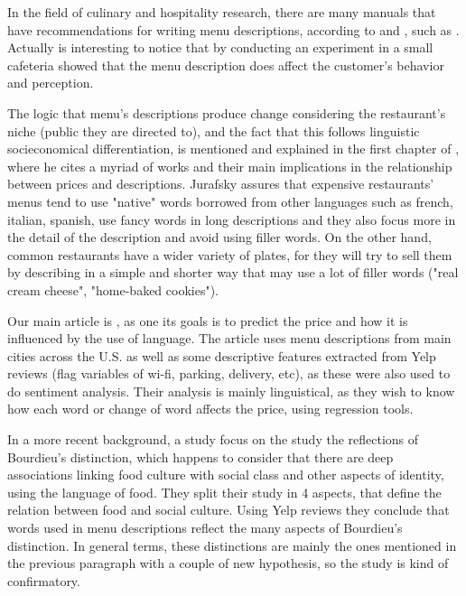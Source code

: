\documentclass[11pt,letterpaper]{article}
\begin{document}
In the field of culinary and hospitality research, there are many manuals that have recommendations for writing menu descriptions, according to \cite{chahuneau2012word} and \cite{jurafsky2014language}, such as \cite{kasavana1990menu} . Actually is interesting to notice that by conducting an experiment in a small cafeteria \cite{wansink2005descriptive} showed that the menu description does affect the customer's behavior and perception.

The logic that menu's descriptions produce change considering the restaurant's niche (public they are directed to), and the fact that this follows linguistic socieconomical differentiation, is mentioned and explained in the first chapter of \cite{jurafsky2014language}, where he cites a myriad of works and their main implications in the relationship between prices and descriptions. Jurafsky assures that expensive restaurants' menus tend to use "native" words borrowed from other languages such as french, italian, spanish, use fancy words in long descriptions and they also focus more in the detail of the description and avoid using filler words. On the other hand, common restaurants have a wider variety of plates, for they will try to sell them by describing in a simple and shorter way that may use a lot of filler words ("real cream cheese", "home-baked cookies"). 

Our main article is  \cite{chahuneau2012word}, as one its goals is to predict the price and how it is influenced by  the use of language. The article uses menu descriptions from main cities across the U.S. as well as some descriptive features extracted from Yelp reviews (flag variables of wi-fi, parking, delivery, etc), as these were also used to do sentiment analysis. Their analysis is mainly linguistical, as they wish to know how each word or change of word affects the price, using regression tools.


In a more recent background, a study  \cite{jurafsky2016bordieu} focus on the study the reflections of Bourdieu's distinction, which happens to consider that there are deep associations linking food culture with social class and other aspects of identity, using the language of food. They split their study in 4 aspects, that define the relation between food and social culture. Using Yelp reviews they conclude that words used in menu descriptions reflect the many aspects of Bourdieu's distinction. In general terms, these distinctions are mainly the ones mentioned in the previous paragraph with a couple of new hypothesis, so the study is kind of confirmatory.
\end{document}
